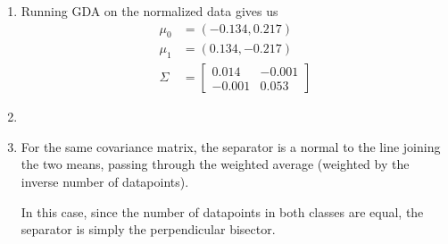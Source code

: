 \documentclass[12pt]{article}
\begin{document}
\begin{enumerate}[label=(\alph*)]
    \item Running GDA on the normalized data gives us 
    \begin{align*}
        \mu_0 &= (-0.134,0.217) \\
        \mu_1 &= (0.134,-0.217) \\
        \Sigma &= 
        \begin{bmatrix}
            0.014 & -0.001 \\
            -0.001 & 0.053
        \end{bmatrix}
    \end{align*}

    \item \begin{center}\end{center}

    \item For the same covariance matrix, the separator is a normal to the line joining the two means, passing through the weighted average (weighted by the inverse number of datapoints).

    In this case, since the number of datapoints in both classes are equal, the separator is simply the perpendicular bisector.

    \begin{center}\end{center}


\end{enumerate}
\end{document}
